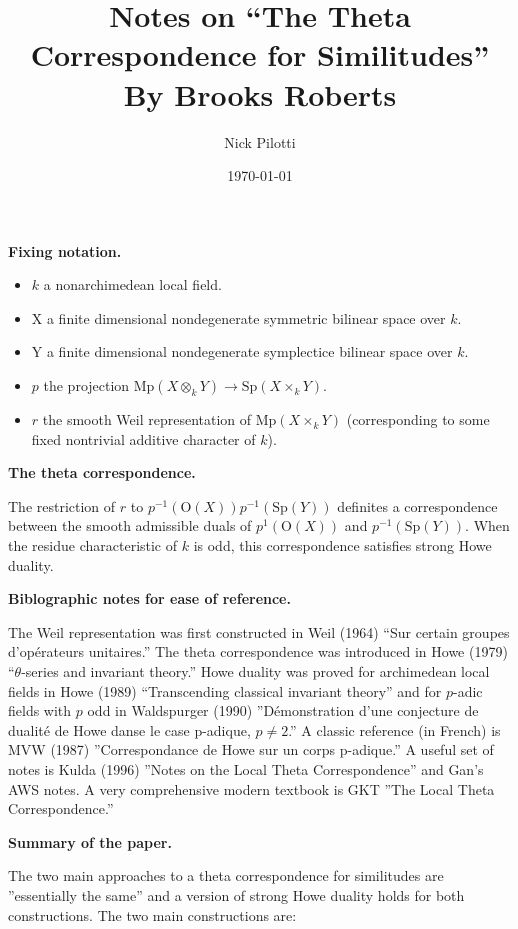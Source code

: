 \documentclass[12pt]{article}
\title{Notes on ``The Theta Correspondence for Similitudes'' By Brooks Roberts}
\author{Nick Pilotti}
\date{\today}
\begin{document}
\maketitle

\textbf{Fixing notation.}
\begin{itemize}
\item $k$ a nonarchimedean local field.
\item X a finite dimensional nondegenerate symmetric bilinear space over $k$.
\item Y a finite dimensional nondegenerate symplectice bilinear space over $k$.
\item $p$ the projection $\text{Mp}\left(X \otimes_{k} Y\right) \rightarrow
\text{Sp}\left(X \times_{k} Y\right)$.
\item $r$ the smooth Weil representation of $\text{Mp}\left(X \times_{k}
Y\right)$ (corresponding to some fixed nontrivial additive character of $k$).
\end{itemize}

\textbf{The theta correspondence.}
 
 The restriction of $r$ to $p^{-1}\left(\text{O}\left(X\right)\right)p^{-1}\left(\text{Sp}\left(Y\right)\right)$
definites a correspondence between the smooth admissible duals of
$p^{1}\left(\text{O}\left(X\right)\right)$ and
$p^{-1}\left(\text{Sp}\left(Y\right)\right)$. When the residue characteristic of
$k$ is odd, this correspondence satisfies strong Howe duality.

\textbf{Biblographic notes for ease of reference.} 

The Weil representation was first constructed in Weil (1964) ``Sur certain
groupes d'opérateurs unitaires.'' The theta correspondence was introduced in
Howe (1979) ``$\theta$-series and invariant theory.'' Howe duality was proved
for archimedean local fields in Howe (1989) ``Transcending classical invariant
theory'' and for $p$-adic fields with $p$ odd in Waldspurger (1990)
''Démonstration d'une conjecture de dualité de Howe danse le case p-adique, $p
\neq 2$.'' A classic reference (in French) is MVW (1987) ''Correspondance de
Howe sur un corps p-adique.'' A useful set of notes is Kulda (1996) ''Notes on
the Local Theta Correspondence'' and Gan's AWS notes. A very comprehensive
modern textbook is GKT ''The Local Theta Correspondence.''

\textbf{Summary of the paper.}

The two main approaches to a theta correspondence for
similitudes are ''essentially the same'' and a version of strong Howe duality
holds for both constructions. The two main constructions are:
\end{document}
